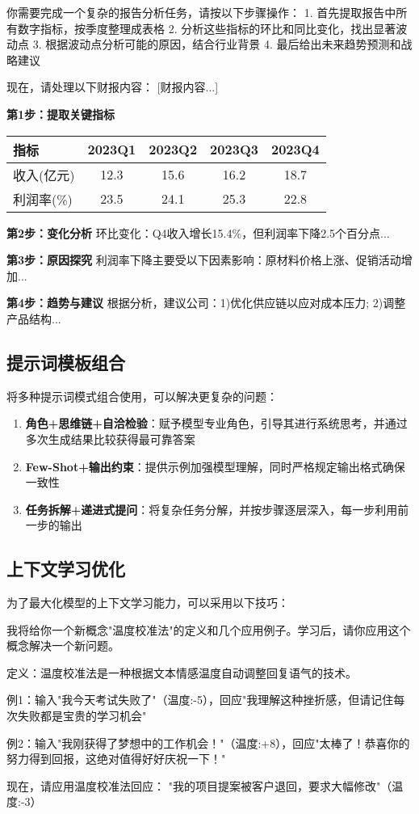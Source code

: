 \documentclass[12pt]{ctexart}
\begin{document}
\begin{promptbox}
你需要完成一个复杂的报告分析任务，请按以下步骤操作：
1. 首先提取报告中所有数字指标，按季度整理成表格
2. 分析这些指标的环比和同比变化，找出显著波动点
3. 根据波动点分析可能的原因，结合行业背景
4. 最后给出未来趋势预测和战略建议

现在，请处理以下财报内容：
[财报内容...]
\end{promptbox}

\begin{outputbox}
\textbf{第1步：提取关键指标}

\begin{tabular}{|l|c|c|c|c|}
\hline
指标 & 2023Q1 & 2023Q2 & 2023Q3 & 2023Q4 \\
\hline
收入(亿元) & 12.3 & 15.6 & 16.2 & 18.7 \\
利润率(\%) & 23.5 & 24.1 & 25.3 & 22.8 \\
\hline
\end{tabular}

\textbf{第2步：变化分析}
环比变化：Q4收入增长15.4\%，但利润率下降2.5个百分点...

\textbf{第3步：原因探究}
利润率下降主要受以下因素影响：原材料价格上涨、促销活动增加...

\textbf{第4步：趋势与建议}
根据分析，建议公司：1)优化供应链以应对成本压力; 2)调整产品结构...
\end{outputbox}

\subsection{提示词模板组合}
将多种提示词模式组合使用，可以解决更复杂的问题：

\begin{enumerate}
  \item \textbf{角色+思维链+自洽检验}：赋予模型专业角色，引导其进行系统思考，并通过多次生成结果比较获得最可靠答案
  \item \textbf{Few-Shot+输出约束}：提供示例加强模型理解，同时严格规定输出格式确保一致性
  \item \textbf{任务拆解+递进式提问}：将复杂任务分解，并按步骤逐层深入，每一步利用前一步的输出
\end{enumerate}

\subsection{上下文学习优化}
为了最大化模型的上下文学习能力，可以采用以下技巧：

\begin{promptbox}
我将给你一个新概念"温度校准法"的定义和几个应用例子。学习后，请你应用这个概念解决一个新问题。

定义：温度校准法是一种根据文本情感温度自动调整回复语气的技术。

例1：输入"我今天考试失败了"（温度:-5），回应"我理解这种挫折感，但请记住每次失败都是宝贵的学习机会"

例2：输入"我刚获得了梦想中的工作机会！"（温度:+8），回应"太棒了！恭喜你的努力得到回报，这绝对值得好好庆祝一下！"

现在，请应用温度校准法回应：
"我的项目提案被客户退回，要求大幅修改"（温度:-3）
\end{promptbox}
\end{document}
